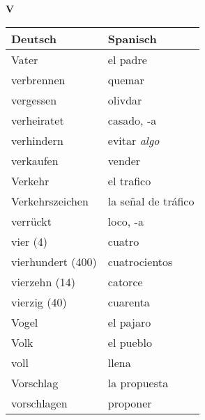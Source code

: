 \begin{flushright}\begin{Huge}\textbf{V}\end{Huge}\end{flushright}

\begin{longtable}{p{} p{}} 
\textbf{Deutsch}     & \textbf{Spanisch}                                       \\ \hline
\hline
\endhead %
Vater & el padre\\
verbrennen & quemar \\
vergessen & olivdar\\
verheiratet & casado, -a\\
verhindern & evitar \textit{algo}\\
verkaufen & vender\\
Verkehr & el trafico\\
Verkehrszeichen & la señal de tráfico\\
verrückt & loco, -a\\
vier (4) & cuatro\\
vierhundert (400) & cuatrocientos\\
vierzehn (14) & catorce\\
vierzig (40) & cuarenta\\
Vogel & el pajaro\\
Volk & el pueblo\\
voll & llena\\
Vorschlag & la propuesta\\
vorschlagen & proponer
\end{longtable}
